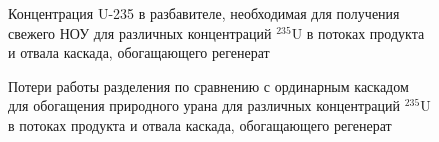 \begin{figure}[ht]
  \caption{Концентрация U-235 в разбавителе, необходимая для получения свежего НОУ для различных концентраций $^{235}$U в потоках продукта и отвала каскада, обогащающего регенерат}\label{fig:sc2_LEU_D}
\end{figure}

\begin{figure}[ht]
  \caption{Потери работы разделения по сравнению с ординарным каскадом для обогащения природного урана для различных концентраций $^{235}$U в потоках продукта и отвала каскада, обогащающего регенерат}\label{Figure_13}
\end{figure}


